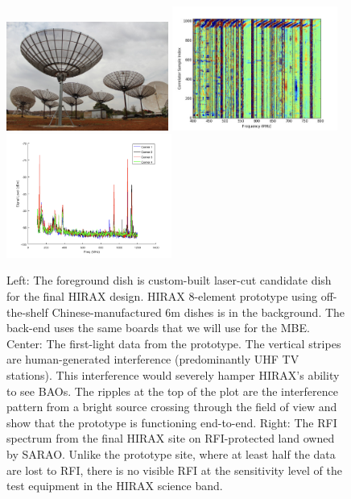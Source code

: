 \documentclass[11pt]{article}
\newcommand{\mbe}{{\rm MBE}}
\begin{document}
\begin{figure}[t]
  \includegraphics[height=1.4in]{rebcon_8element_small.jpg}
  \includegraphics[height=1.6in]{first_fringe.jpg}
  \includegraphics[height=1.6in]{hirax_site_rfi.png} 
\caption{\small Left: The foreground dish is custom-built laser-cut
  candidate dish for the final HIRAX design.  HIRAX 8-element prototype using off-the-shelf
  Chinese-manufactured 6m dishes is in the background.  The back-end uses the same boards
  that we will use for the \mbe.  Center:  The first-light data from
  the prototype.  The vertical stripes are human-generated
  interference (predominantly UHF TV stations). This interference
  would severely hamper HIRAX's ability to see BAOs.  The ripples at
  the top of the plot are the interference pattern from a bright
  source crossing through the field of view and show that the
  prototype is functioning end-to-end.  Right:  The RFI spectrum from
  the final HIRAX site on RFI-protected land owned by SARAO.  Unlike
  the prototype site, where at least half the data are lost to RFI,
  there is no visible RFI at the sensitivity level of the test
  equipment in the HIRAX science band.
  \label{fig:hirax8}
}
\end{figure}
\end{document}

